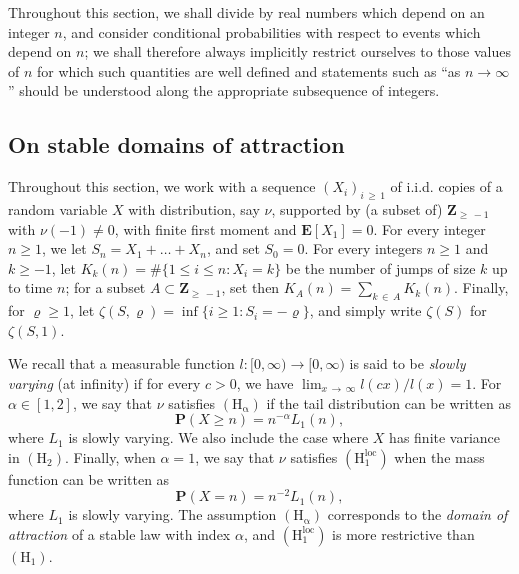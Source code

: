 \documentclass[AHL,Unicode,longabstracts,published]{cedram}
\newcommand{\ensembles}[1]{\mathbf{#1}}
\newcommand{\Z}{\ensembles{Z}}
\renewcommand{\P}{\ensembles{P}}
\newcommand{\E}{\ensembles{E}}
\renewcommand{\Pr}[1]{\P\left(#1\right)}
\newcommand{\1}{\ensembles{1}}
\renewcommand{\le}{\leqslant}
\renewcommand{\ge}{\geqslant}
\newcommand{\Hrm}{\mathrm{H}}
\newcommand{\Hrmloc}{\mathrm{(H_1^{loc})}}
\newcommand{\Hrmalp}{\mathrm{(H_\alpha)}}
\begin{document}
Throughout this section, we shall divide by real numbers which depend on an integer $n$, and consider conditional probabilities with respect to events which depend on $n$; we shall therefore always implicitly restrict ourselves to those values of $n$ for which such quantities are well defined and statements such as ``as $n \to \infty$'' should be understood along the appropriate subsequence of integers.


\subsection{On stable domains of attraction}\label{sec:marche_stable}


Throughout this section, we work with a sequence $(X_i)_{i\,\ge\,1}$ of i.i.d. copies of a random variable $X$ with distribution, say $\nu$, supported by (a subset of) $\Z_{\ge\,-1}$ with $\nu(-1) \ne 0$, with finite first moment and $\E[X_1] = 0$. For every integer $n \ge 1$, we let $S_n = X_1 + \dots + X_n$, and set $S_0 = 0$. For every integers $n \ge 1$ and $k \ge -1$, let $K_k(n) = \#\{1 \le i \le n : X_i = k\}$ be the number of jumps of size $k$ up to time $n$; for a subset $A \subset \Z_{\ge\,-1}$, set then $K_A(n) = \sum_{k\,\in\,A} K_k(n)$. Finally, for $\varrho \ge 1$, let $\zeta(S, \varrho) = \inf\{i \ge 1 : S_i = - \varrho\}$, and simply write $\zeta(S)$ for $\zeta(S,1)$.


We recall that a measurable function $l : [0, \infty) \to [0, \infty)$ is said to be \emph{slowly varying} (at infinity) if for every $c > 0$, we have $\lim_{x\,\to\, \infty} l(cx)/l(x) = 1$. For $\alpha \in [1,2]$, we say that $\nu$ satisfies $\Hrmalp$ if the tail distribution can be written as
\[
\Pr{X \ge n} = n^{-\alpha} L_1(n),
\]
where $L_1$ is slowly varying. We also include the case where $X$ has finite variance in $(\Hrm_2)$. Finally, when $\alpha = 1$, we say that $\nu$ satisfies $\Hrmloc$ when the mass function can be written as
\[
\Pr{X = n} = n^{-2} L_1(n),
\]
where $L_1$ is slowly varying. The assumption $\Hrmalp$ corresponds to the \emph{domain of attraction} of a stable law with index $\alpha$, and $\Hrmloc$ is more restrictive than $(\Hrm_1)$.
\end{document}
